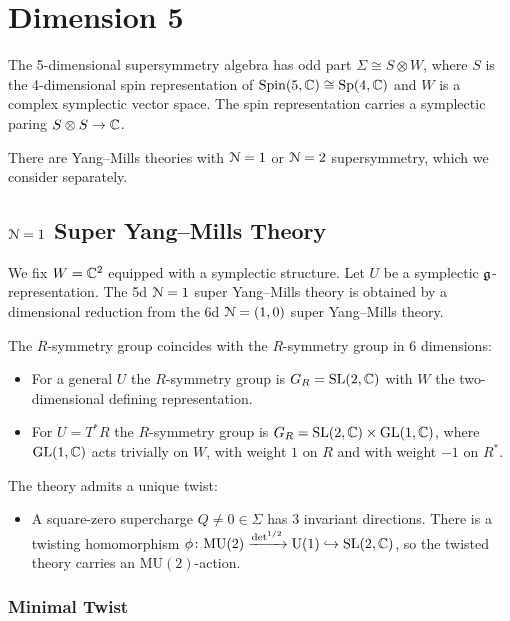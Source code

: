 \documentclass[10pt, oneside]{article}
\newcommand{\MU}{\mathrm{MU}}
\renewcommand{\U}{\mathrm{U}}
\begin{document}
\section{Dimension 5}

The 5-dimensional supersymmetry algebra has odd part $\Sigma\cong S\otimes W$, where $S$ is the 4-dimensional spin representation of $\mathrm{Spin}(5, \mathbb C)\cong \mathrm{Sp}(4, \mathbb C)$ and $W$ is a complex symplectic vector space. The spin representation carries a symplectic paring $S\otimes S\rightarrow \mathbb C$.

There are Yang--Mills theories with $\mathcal N=1$ or $\mathcal N=2$ supersymmetry, which we consider separately.

\subsection{\texorpdfstring{$\mathcal{N} = 1$}{N=1} Super Yang--Mills Theory}
\label{5d_1_section}

We fix $W = \mathbb C^2$ equipped with a symplectic structure. Let $U$ be a symplectic $\mathfrak g$-representation. The 5d $\mathcal N=1$ super Yang--Mills theory is obtained by a dimensional reduction from the 6d $\mathcal N=(1, 0)$ super Yang--Mills theory.

The $R$-symmetry group coincides with the $R$-symmetry group in 6 dimensions:
\begin{itemize}
\item For a general $U$ the $R$-symmetry group is $G_R=\mathrm{SL}(2, \mathbb C)$ with $W$ the two-dimensional defining representation.

\item For $U=T^* R$ the $R$-symmetry group is $G_R=\mathrm{SL}(2, \mathbb C)\times \mathrm{GL}(1, \mathbb C)$, where $\mathrm{GL}(1, \mathbb C)$ acts trivially on $W$, with weight $1$ on $R$ and with weight $-1$ on $R^*$.
\end{itemize}

The theory admits a unique twist:
\begin{itemize}
\item A square-zero supercharge $Q\neq 0\in\Sigma$ has 3 invariant directions. There is a twisting homomorphism $\phi\colon \MU(2)\xrightarrow{\det^{1/2}}\U(1)\hookrightarrow \SL(2, \CC)$, so the twisted theory carries an $\MU(2)$-action.
\end{itemize}

\subsubsection{Minimal Twist}
\label{sect:5d1minimaltwist}
\end{document}
